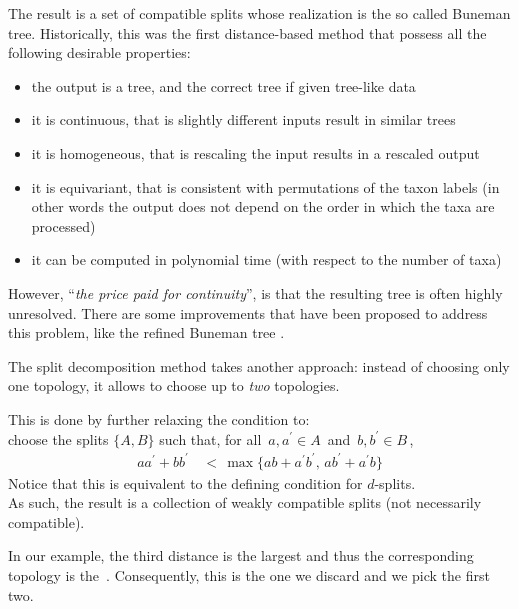 \documentclass[./main.tex]{subfiles}
\begin{document}
The result is a set of compatible splits whose realization is the so called Buneman tree. Historically, this was the first distance-based method that possess all the following desirable properties:\footnotemark
\begin{itemize}
    \item the output is a tree, and the correct tree if given tree-like data
    \item it is continuous, that is slightly different inputs result in similar trees
    \item it is homogeneous, that is rescaling the input results in a rescaled output
    \item it is equivariant, that is consistent with permutations of the taxon labels (in other words the output does not depend on the order in which the taxa are processed)
    \item it can be computed in polynomial time (with respect to the number of taxa)
\end{itemize}


\clearpage

However, \enquote{\emph{the price paid for continuity}}, is that the resulting tree is often highly unresolved. There are some improvements that have been proposed to address this problem, like the refined Buneman tree \cite{MS99,BM99}.\bigskip

The split decomposition method takes another approach: instead of choosing only one topology, it allows to choose up to \emph{two} topologies.

This is done by further relaxing the condition to: \\
choose the splits $\{A,B\}$ such that, for all $\, a,a^\prime \in A \,$ and $\, b,b^\prime \in B \,$,
\begin{align*}
    a a^\prime + b b^\prime &\,<\, \max {\{ a b + a^\prime b^\prime ,\, a b^\prime + a^\prime b \}}
\end{align*}
Notice that this is equivalent to the defining condition for $d$-splits. \\
As such, the result is a collection of weakly compatible splits (not necessarily compatible).

In our example, the third distance is the largest and thus the corresponding topology is the \,\footnotemark. Consequently, this is the one we discard and we pick the first two.
\end{document}
